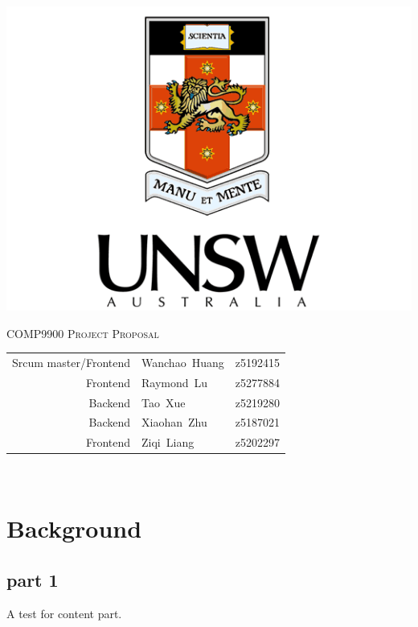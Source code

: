 \documentclass[12pt]{article}
\begin{document}
\begin{titlepage}
  \centering
  {\centering
    \includegraphics[height=0.3\textheight]{images/unsw.png}\par
  }
  \vspace{1cm}
  {\scshape\huge COMP9900 Project Proposal\par}
  \vspace{2cm}
  
  \begin{center}
    \renewcommand{\arraystretch}{1.5}
    \begin{tabular}{r l l} 
         Srcum master/Frontend& Wanchao\ Huang &z5192415\\
         Frontend             & Raymond\ Lu     &z5277884\\
         Backend              & Tao\ Xue       &z5219280\\
         Backend              & Xiaohan\ Zhu    &z5187021\\
         Frontend             & Ziqi\ Liang     &z5202297\\ 
    \end{tabular}\\
\end{center}
  \vspace{1cm}
\end{titlepage}

\tableofcontents
\newpage

\section{Background}
\subsection{part 1}
A test for content part.
\end{document}
